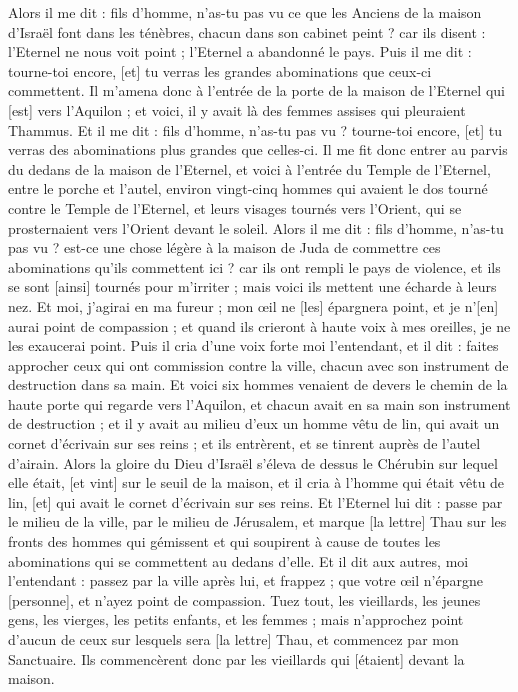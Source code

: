 \begin{multicols}{2}
Alors il me dit : fils d'homme, n'as-tu pas vu ce que les Anciens de la maison d'Israël font dans les ténèbres, chacun dans son cabinet peint ? car ils disent : l'Eternel ne nous voit point ; l'Eternel a abandonné le pays.
Puis il me dit : tourne-toi encore, [et] tu verras les grandes abominations que ceux-ci commettent.
Il m'amena donc à l'entrée de la porte de la maison de l'Eternel qui [est] vers l'Aquilon ; et voici, il y avait là des femmes assises qui pleuraient Thammus.
Et il me dit : fils d'homme, n'as-tu pas vu ? tourne-toi encore, [et] tu verras des abominations plus grandes que celles-ci.
Il me fit donc entrer au parvis du dedans de la maison de l'Eternel, et voici à l'entrée du Temple de l'Eternel, entre le porche et l'autel, environ vingt-cinq hommes qui avaient le dos tourné contre le Temple de l'Eternel, et leurs visages tournés vers l'Orient, qui se prosternaient vers l'Orient devant le soleil.
Alors il me dit : fils d'homme, n'as-tu pas vu ? est-ce une chose légère à la maison de Juda de commettre ces abominations qu'ils commettent ici ? car ils ont rempli le pays de violence, et ils se sont [ainsi] tournés pour m'irriter ; mais voici ils mettent une écharde à leurs nez.
Et moi, j'agirai en ma fureur ; mon œil ne [les] épargnera point, et je n'[en] aurai point de compassion ; et quand ils crieront à haute voix à mes oreilles, je ne les exaucerai point.
\VerseOne{}Puis il cria d'une voix forte moi l'entendant, et il dit : faites approcher ceux qui ont commission contre la ville, chacun avec son instrument de destruction dans sa main.
Et voici six hommes venaient de devers le chemin de la haute porte qui regarde vers l'Aquilon, et chacun avait en sa main son instrument de destruction ; et il y avait au milieu d'eux un homme vêtu de lin, qui avait un cornet d'écrivain sur ses reins ; et ils entrèrent, et se tinrent auprès de l'autel d'airain.
Alors la gloire du Dieu d'Israël s'éleva de dessus le Chérubin sur lequel elle était, [et vint] sur le seuil de la maison, et il cria à l'homme qui était vêtu de lin, [et] qui avait le cornet d'écrivain sur ses reins.
Et l'Eternel lui dit : passe par le milieu de la ville, par le milieu de Jérusalem, et marque [la lettre] Thau sur les fronts des hommes qui gémissent et qui soupirent à cause de toutes les abominations qui se commettent au dedans d'elle.
Et il dit aux autres, moi l'entendant : passez par la ville après lui, et frappez ; que votre œil n'épargne [personne], et n'ayez point de compassion.
Tuez tout, les vieillards, les jeunes gens, les vierges, les petits enfants, et les femmes ; mais n'approchez point d'aucun de ceux sur lesquels sera [la lettre] Thau, et commencez par mon Sanctuaire. Ils commencèrent donc par les vieillards qui [étaient] devant la maison.

\end{multicols}
